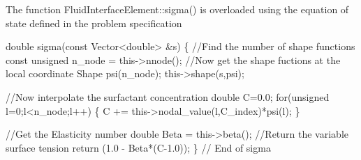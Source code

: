 The function {\ttfamily Fluid\+Interface\+Element\+::sigma()} is overloaded using the equation of state defined in the problem specification  
\begin{DoxyCodeInclude}
 \textcolor{keywordtype}{double} sigma(\textcolor{keyword}{const} Vector<double> &s)
  \{
   \textcolor{comment}{//Find the number of shape functions}
   \textcolor{keyword}{const} \textcolor{keywordtype}{unsigned} n\_node = this->nnode();
   \textcolor{comment}{//Now get the shape fuctions at the local coordinate}
   Shape psi(n\_node);
   this->shape(s,psi);
   
   \textcolor{comment}{//Now interpolate the surfactant concentration}
   \textcolor{keywordtype}{double} C=0.0;
   \textcolor{keywordflow}{for}(\textcolor{keywordtype}{unsigned} l=0;l<n\_node;l++)
    \{
     C += this->nodal\_value(l,C\_index)*psi(l);
    \}
   
   \textcolor{comment}{//Get the Elasticity number}
   \textcolor{keywordtype}{double} Beta = this->beta();
   \textcolor{comment}{//Return the variable surface tension}
   \textcolor{keywordflow}{return} (1.0 - Beta*(C-1.0));
  \} \textcolor{comment}{// End of sigma}

\end{DoxyCodeInclude}


